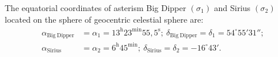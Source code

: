\begin{description}
  The equatorial coordinates of asterism Big Dipper $(\sigma_1)$ and Sirius
  $(\sigma_2)$ located on the sphere of geocentric celestial sphere are:
  \begin{align*}
  \alpha_{\mathrm{Big\ Dipper}} &= \alpha_1
    = 13^{\mathrm{h}}23^{\mathrm{min}}55{,}5^{\mathrm{s}};\
  \delta_{\mathrm{Big\ Dipper}} = \delta_1 = 54^\circ55'31'';\\
  \alpha_{\mathrm{Sirius}} &= \alpha_2 = 6^{\mathrm{h}}45^{\mathrm{min}};\
  \delta_{\mathrm{Sirius}} = \delta_2 = -16^\circ43'.
  \end{align*}


\end{description}
